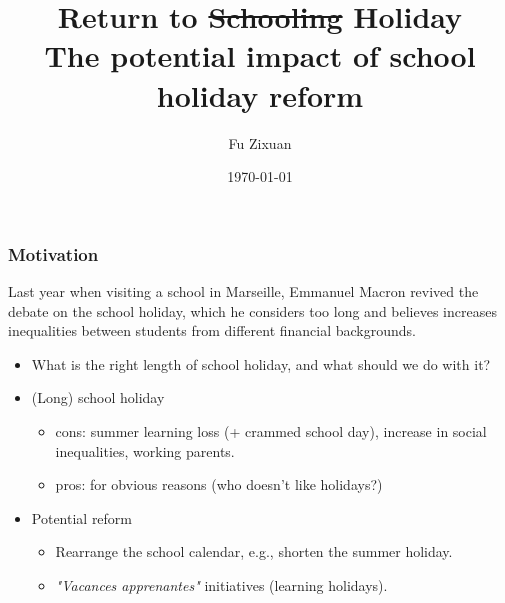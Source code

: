 \documentclass[10pt,mathserif,aspectratio=169]{beamer}
\title{\large \bfseries Return to \sout{Schooling} Holiday \\
  The potential impact of school holiday reform
}
\author{Fu Zixuan\\[3ex]
}
\date{\today}
\begin{document}
\frame{
  \thispagestyle{empty}
  \titlepage
}


\begin{frame}[label=motivation]
  \frametitle{Motivation}
  Last year when visiting a school in Marseille, Emmanuel Macron revived the
  debate on the school holiday, which he
  considers too long and believes increases inequalities between students from different financial backgrounds.

  \begin{itemize}
    \item What is the right length of school holiday, and what should we do with it?
    \item (Long) school holiday
          \begin{itemize}
            \item cons: summer learning loss (+ crammed school day), increase in social
                  inequalities, working parents.
            \item pros: for obvious reasons (who doesn't like holidays?)
          \end{itemize}
    \item Potential reform
          \begin{itemize}
            \item Rearrange the school calendar, e.g., shorten the summer holiday.
            \item \textit{"Vacances apprenantes"} initiatives (learning holidays).
          \end{itemize}
  \end{itemize}
\end{frame}
\end{document}
